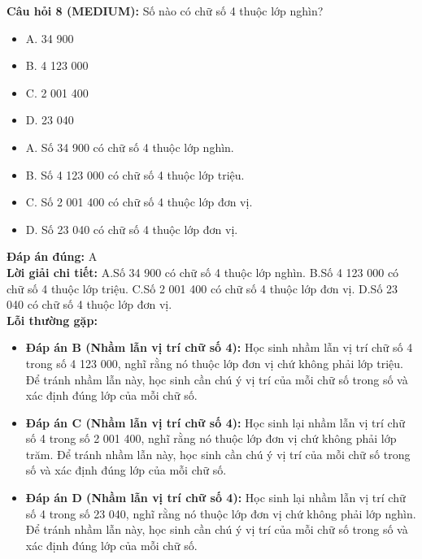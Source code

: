 \documentclass{article}
\begin{document}
\begin{minipage}{\textwidth}
\noindent\textbf{Câu hỏi 8 (MEDIUM):} Số nào có chữ số 4 thuộc lớp nghìn? 
\begin{itemize}[label={}]
    \item A. 34 900
    \item B. 4 123 000
    \item C. 2 001 400
    \item D. 23 040
    \item A. Số 34 900 có chữ số 4 thuộc lớp nghìn.
    \item B. Số 4 123 000 có chữ số 4 thuộc lớp triệu.
    \item C. Số 2 001 400 có chữ số 4 thuộc lớp đơn vị.
    \item D. Số 23 040 có chữ số 4 thuộc lớp đơn vị.
\end{itemize}
\textbf{Đáp án đúng:} A \\
\textbf{Lời giải chi tiết:} A.Số 34 900 có chữ số 4 thuộc lớp nghìn. B.Số 4 123 000 có chữ số 4 thuộc lớp triệu. C.Số 2 001 400 có chữ số 4 thuộc lớp đơn vị. D.Số 23 040 có chữ số 4 thuộc lớp đơn vị. \\
\textbf{Lỗi thường gặp:}
\begin{itemize}
  \item \textbf{Đáp án B (Nhầm lẫn vị trí chữ số 4):} Học sinh nhầm lẫn vị trí chữ số 4 trong số 4 123 000, nghĩ rằng nó thuộc lớp đơn vị chứ không phải lớp triệu. Để tránh nhầm lẫn này, học sinh cần chú ý vị trí của mỗi chữ số trong số và xác định đúng lớp của mỗi chữ số.
  \item \textbf{Đáp án C (Nhầm lẫn vị trí chữ số 4):} Học sinh lại nhầm lẫn vị trí chữ số 4 trong số 2 001 400, nghĩ rằng nó thuộc lớp đơn vị chứ không phải lớp trăm. Để tránh nhầm lẫn này, học sinh cần chú ý vị trí của mỗi chữ số trong số và xác định đúng lớp của mỗi chữ số.
  \item \textbf{Đáp án D (Nhầm lẫn vị trí chữ số 4):} Học sinh lại nhầm lẫn vị trí chữ số 4 trong số 23 040, nghĩ rằng nó thuộc lớp đơn vị chứ không phải lớp nghìn. Để tránh nhầm lẫn này, học sinh cần chú ý vị trí của mỗi chữ số trong số và xác định đúng lớp của mỗi chữ số.
\end{itemize}
\end{minipage}
\vspace{1em}
\end{document}
